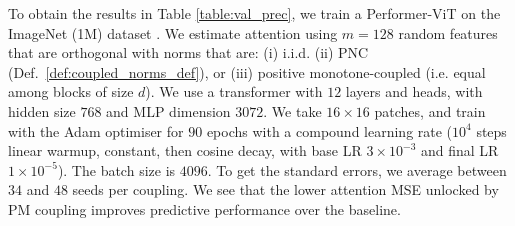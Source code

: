 To obtain the results in Table \ref{table:val_prec}, we train a Performer-ViT \citep{dosovitskiy2020image, choromanski2020rethinking} on the ImageNet (1M) dataset \citep{deng2009imagenet}.
We estimate attention using $m=128$ random features that are orthogonal with norms that are: (i) i.i.d. (ii) PNC (Def.~\ref{def:coupled_norms_def}), or (iii) positive monotone-coupled (i.e. equal among blocks of size $d$).
We use a transformer with $12$ layers and heads, with hidden size $768$ and MLP dimension $3072$. 
We take $16 \times 16$ patches, and train with the Adam optimiser for $90$ epochs with a compound learning rate ($10^4$ steps linear warmup, constant, then cosine decay, with base LR $3 \times 10^{-3}$ and final LR $1 \times 10^{-5}$). 
The batch size is $4096$.
To get the standard errors, we average between $34$ and $48$ seeds per coupling.
We see that the lower attention MSE unlocked by PM coupling improves predictive performance over the baseline.





